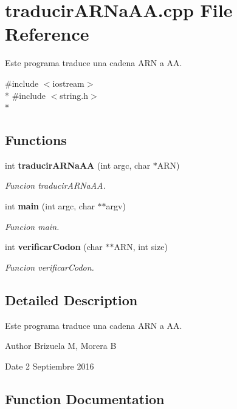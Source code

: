 \section{traducir\-A\-R\-Na\-A\-A.\-cpp File Reference}
\label{traducir_a_r_na_a_a_8cpp}


Este programa traduce una cadena A\-R\-N a A\-A.  


{\ttfamily \#include $<$iostream$>$}\\*
{\ttfamily \#include $<$string.\-h$>$}\\*
\subsection*{Functions}
\begin{DoxyCompactItemize}
\item 
int {\bf traducir\-A\-R\-Na\-A\-A} (int argc, char $\ast$A\-R\-N)
\begin{DoxyCompactList}\small\item\em Funcion traducir\-A\-R\-Na\-A\-A. \end{DoxyCompactList}\item 
int {\bf main} (int argc, char $\ast$$\ast$argv)
\begin{DoxyCompactList}\small\item\em Funcion main. \end{DoxyCompactList}\item 
int {\bf verificar\-Codon} (char $\ast$$\ast$A\-R\-N, int size)
\begin{DoxyCompactList}\small\item\em Funcion verificar\-Codon. \end{DoxyCompactList}\end{DoxyCompactItemize}


\subsection{Detailed Description}
Este programa traduce una cadena A\-R\-N a A\-A. \begin{DoxyAuthor}{Author}
Brizuela M, Morera B 
\end{DoxyAuthor}
\begin{DoxyDate}{Date}
2 Septiembre 2016 
\end{DoxyDate}


\subsection{Function Documentation}
